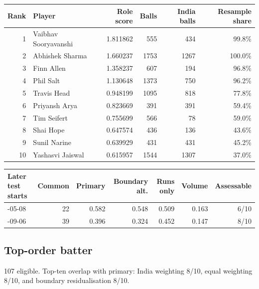\begin{center}
\begin{tabularx}{\linewidth}{r>{\raggedright\arraybackslash}Xrrrr}
\toprule
Rank & Player & Role score & Balls & India balls & Resample share \\
\midrule
1 & Vaibhav Sooryavanshi & 1.811862 & 555 & 434 & 99.8\% \\
2 & Abhishek Sharma & 1.660237 & 1753 & 1267 & 100.0\% \\
3 & Finn Allen & 1.358237 & 607 & 194 & 96.8\% \\
4 & Phil Salt & 1.130648 & 1373 & 750 & 96.2\% \\
5 & Travis Head & 0.948199 & 1095 & 818 & 77.8\% \\
6 & Priyansh Arya & 0.823669 & 391 & 391 & 59.4\% \\
7 & Tim Seifert & 0.755699 & 566 & 78 & 59.0\% \\
8 & Shai Hope & 0.647574 & 436 & 136 & 43.6\% \\
9 & Sunil Narine & 0.639929 & 431 & 431 & 45.2\% \\
10 & Yashasvi Jaiswal & 0.615957 & 1544 & 1307 & 37.0\% \\
\bottomrule
\end{tabularx}
\end{center}

\begin{center}
\begin{tabularx}{\linewidth}{>{\raggedright\arraybackslash}Xrrrrrr}
\toprule
Later test starts & Common & Primary & Boundary alt. & Runs only & Volume & Assessable \\
\midrule
2024-05-08 & 22 & 0.582 & 0.548 & 0.509 & 0.163 & 6/10 \\
2025-09-06 & 39 & 0.396 & 0.324 & 0.452 & 0.147 & 8/10 \\
\bottomrule
\end{tabularx}
\end{center}

\subsection{Top-order batter}

107 eligible. Top-ten overlap with primary: India weighting 8/10, equal weighting 8/10, and boundary residualisation 8/10.

